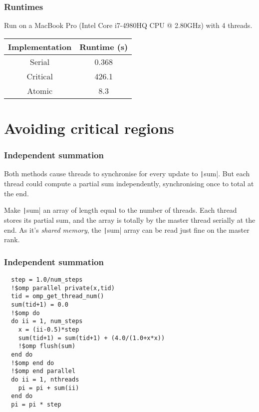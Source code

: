 \documentclass{beamer}
\begin{document}
\begin{frame}
\frametitle{Runtimes}
Run on a MacBook Pro (Intel Core i7-4980HQ CPU @ 2.80GHz) with 4 threads.

\begin{table}
\begin{tabular}{cc}
\toprule
Implementation & Runtime (s) \\
\midrule
Serial   & 0.368 \\
Critical & 426.1 \\
Atomic   & 8.3 \\
\bottomrule
\end{tabular}
\end{table}
\end{frame}

\section{Avoiding critical regions}
\begin{frame}
\frametitle{Independent summation}
Both methods cause threads to synchronise for every update to \texttt|sum|.
But each thread could compute a partial sum independently, synchronising once to total at the end.

Make \texttt|sum| an array of length equal to the number of threads.
Each thread stores its partial sum, and the array is totally by the master thread serially at the end.
As it's \emph{shared memory}, the \texttt|sum| array can be read just fine on the master rank.
\end{frame}

\begin{frame}[fragile]
\frametitle{Independent summation}
\begin{verbatim}
  step = 1.0/num_steps
  !$omp parallel private(x,tid)
  tid = omp_get_thread_num()
  sum(tid+1) = 0.0
  !$omp do
  do ii = 1, num_steps
    x = (ii-0.5)*step
    sum(tid+1) = sum(tid+1) + (4.0/(1.0+x*x))
    !$omp flush(sum)
  end do
  !$omp end do
  !$omp end parallel
  do ii = 1, nthreads
    pi = pi + sum(ii)
  end do
  pi = pi * step
\end{verbatim}
\end{frame}
\end{document}
